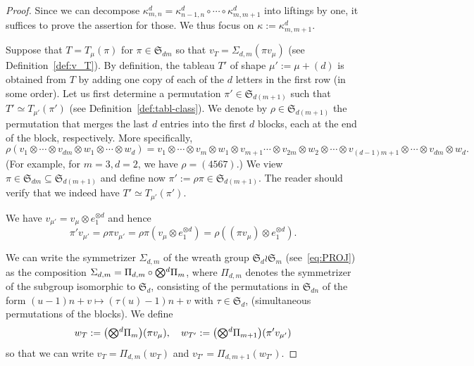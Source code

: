 \documentclass[11pt]{amsart}
\def\ot{\otimes}
\newcommand{\aS}{\ensuremath{\mathfrak{S}}}
\newcommand{\tensor}{\smash{\textstyle\bigotimes}}
\numberwithin{equation}{section}
\begin{document}
\begin{proof}
Since we can decompose $\kappa^d_{m,n} = \kappa^d_{n-1,n}\circ\cdots\circ\kappa^d_{m,m+1}$
into liftings by one, it suffices to prove the assertion for those. 
We thus focus on $\kappa := \kappa^d_{m,m+1}$. 

Suppose that $T=T_\mu(\pi)$ for $\pi\in\aS_{dm}$ so that 
$v_T = \Sigma_{d,m}(\pi v_\mu)$ (see Definition~\ref{def:v_T}).
By definition, the tableau $T'$ of shape $\mu' := \mu + (d)$ is 
obtained from $T$ by adding one copy of each of the $d$ letters 
in the first row (in some order). 
Let us first determine a permutation $\pi' \in \aS_{d(m+1)}$ such that 
$T' \simeq T_{\mu'}(\pi')$ (see Definition~\ref{def:tabl-class}).
We denote by $\rho\in\aS_{d(m+1)}$ the permutation that merges 
the last $d$ entries into the first $d$ blocks, each at the end of the block, respectively. 
More specifically,
$$
 \rho(v_1\ot\cdots \ot v_{dm}\ot w_1\ot\cdots\ot w_d) = 
  v_1\ot\cdots \ot v_{m}\ot w_1\ot v_{m+1}\cdots\ot v_{2m}\ot w_2\ot\cdots \ot v_{(d-1)m+1}\ot\cdots\ot v_{dm}\ot w_d .
$$
(For example, for $m=3,d=2$, we have $\rho = (4567)$.) 
We view $\pi\in\aS_{dm}\subseteq\aS_{d(m+1)}$ and define now 
$\pi' := \rho \pi\in\aS_{d(m+1)}$.
The reader should verify that we indeed have 
$T' \simeq T_{\mu'}(\pi')$. %

We have $v_{\mu'} = v_\mu \ot e_1^{\ot d}$ and hence 
\begin{equation}\label{eq:rhof}
 \pi' v_{\mu'} = \rho \pi v_{\mu'} 
 = \rho \pi (v_\mu \ot e_1^{\ot d}) = \rho ((\pi v_\mu)\ot e_1^{\ot d}) .
\end{equation}


We can write the symmetrizer $\Sigma_{d,m}$  
of the wreath group $\aS_d\wr\aS_m$ (see~\eqref{eq:PROJ})
as the composition 
$\Sigma_{d,m} = \Pi_{d,m}\circ \tensor^d \Pi_m$,
where 
$\Pi_{d,m}$ denotes the symmetrizer of the subgroup isomorphic to $\aS_d$, 
consisting of the permutations in $\aS_{dn}$ of the form
$(u-1)n+v \mapsto (\tau(u) -1) n +v$ with $\tau \in\aS_d$, 
(simultaneous permutations of the blocks). 
We define 
$$
 w_T := \big(\tensor^d \Pi_m\big) (\pi v_\mu), \quad 
 w_{T'} := \big(\tensor^d \Pi_{m+1}\big) (\pi' v_{\mu'}) 
$$
so that we can write $v_T = \Pi_{d,m}(w_T)$ and $v_{T'} = \Pi_{d,m+1}(w_{T'})$. 


\end{proof}
\end{document}
